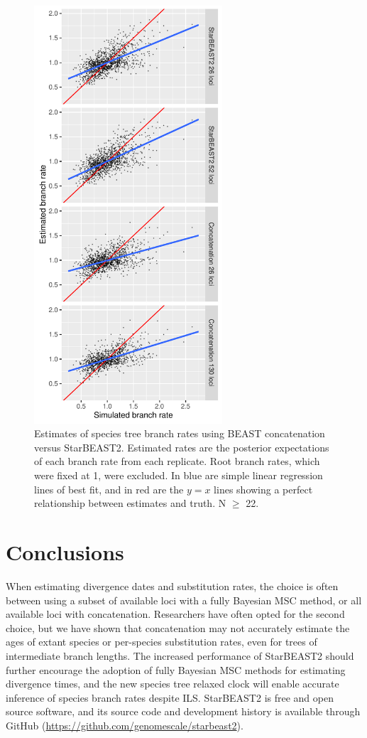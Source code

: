 \documentclass[nogrid]{MBE}%
\begin{document}
\begin{figure}[htb!]
\centering
\includegraphics[width=70mm]{branch_rates_phased.pdf}
\caption
{Estimates of species tree branch rates using BEAST concatenation versus
StarBEAST2. Estimated rates are the posterior expectations of each branch rate
from each replicate. Root branch rates, which were fixed at 1, were excluded.
In blue are simple linear regression lines of best fit, and in red are the $y
= x$ lines showing a perfect relationship between estimates and truth. N $\ge$ 22.}
\label{fig:branchRates}
\end{figure}

\section{Conclusions}

When estimating divergence dates and substitution rates, the choice is often
between using a subset of available loci with a fully Bayesian MSC method, or
all available loci with concatenation. Researchers have often opted for the
second choice, but we have shown that concatenation may not accurately
estimate the ages of extant species or per-species substitution rates, even
for trees of intermediate branch lengths. The increased performance of
StarBEAST2 should further encourage the adoption of fully Bayesian MSC methods
for estimating divergence times, and the new species tree relaxed clock will
enable accurate inference of species branch rates despite ILS. StarBEAST2 is
free and open source software, and its source code and development history is
available through GitHub (\url{https://github.com/genomescale/starbeast2}).
\end{document}
